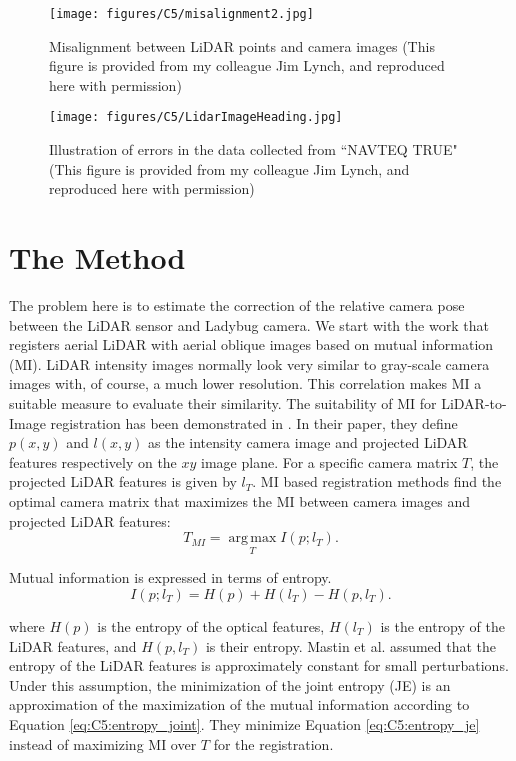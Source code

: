 \begin{figure}[H]
\centering
\texttt{[image: figures/C5/misalignment2.jpg]} \\
\caption{Misalignment between LiDAR points and camera images (This figure is provided from my colleague Jim Lynch, and reproduced here with permission)} 
\label{fig:C5:misalignment}
\end{figure}

\begin{figure}[H]
\centering
\texttt{[image: figures/C5/LidarImageHeading.jpg]} \\
\caption{Illustration of errors in the data collected from ``NAVTEQ TRUE" (This figure is provided from my colleague Jim Lynch, and reproduced here with permission)}
\label{fig:C5:errors}
\end{figure}

\section{The Method}

The problem here is to estimate the correction of the relative camera pose between the LiDAR sensor and Ladybug camera. 
We start with the work \cite{MastinFisher09} that registers aerial LiDAR with aerial oblique images based on mutual information (MI).
LiDAR intensity images normally look very similar to gray-scale camera images with, of course, a much lower resolution. This
correlation makes MI a suitable measure to evaluate their similarity.
The suitability of MI for LiDAR-to-Image registration has been demonstrated in \cite{MastinFisher09}. In their paper, they define $p(x,y)$ and $l(x,y)$ as the intensity camera image and projected LiDAR features respectively on the $xy$ image plane. For a specific camera matrix $T$, the projected LiDAR features is given by $l_T$. MI based registration methods find the optimal camera matrix that maximizes the MI between camera images and projected LiDAR features: 
\begin{equation}
T_{MI} =  \operatorname*{arg\,max}_T  I(p; l_T).
\label{eq:C5:entropy7}
\end{equation}  

Mutual information is expressed in terms of entropy. 
\begin{equation}
I(p; l_T) = H(p) + H(l_T) - H(p, l_T).
\label{eq:C5:entropy_joint}
\end{equation} 

where $H(p)$ is the entropy of the optical features, $H(l_T)$ is the entropy of the LiDAR features, and $H(p, l_T)$ is their entropy. Mastin et al. \cite{MastinFisher09} assumed that the entropy of the LiDAR features is approximately constant for small perturbations. Under this assumption, the minimization of the joint entropy (JE) is an approximation of the maximization of the mutual information according to Equation \ref{eq:C5:entropy_joint}. They minimize Equation \ref{eq:C5:entropy_je}
instead of maximizing MI over $T$ for the registration.


